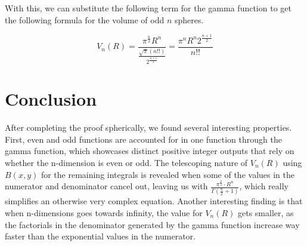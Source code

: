 \documentclass{article}
\begin{document}
With this, we can substitute the following term for the gamma function to get the following formula for the volume of odd $n$ spheres.

\[ V_n(R)=\frac{\pi^\frac{n}{2}R^n}{\frac{\sqrt{\pi}(n!!)}{2^\frac{n+1}{2}}}=\frac{\pi^nR^n2^\frac{n+1}{2}}{n!!}
\]

\section*{Conclusion}
After completing the proof spherically, we found several interesting properties. First, even and odd functions are accounted for in one function through the gamma function, which showcases distinct positive integer outputs that rely on whether the n-dimension is even or odd. The telescoping nature of $V_n(R)$ using $B(x,y)$ for the remaining integrals is revealed when some of the values in the numerator and denominator cancel out, leaving us with $\frac{\pi^\frac{n}{2} \cdot R^n}{\Gamma(\frac{n}{2} + 1)}$, which really simplifies an otherwise very complex equation. Another interesting finding is that when n-dimensions goes towards infinity, the value for $V_n(R)$ gets smaller, as the factorials in the denominator generated by the gamma function increase way faster than the exponential values in the numerator.


\nocite{*}  %


\end{document}
